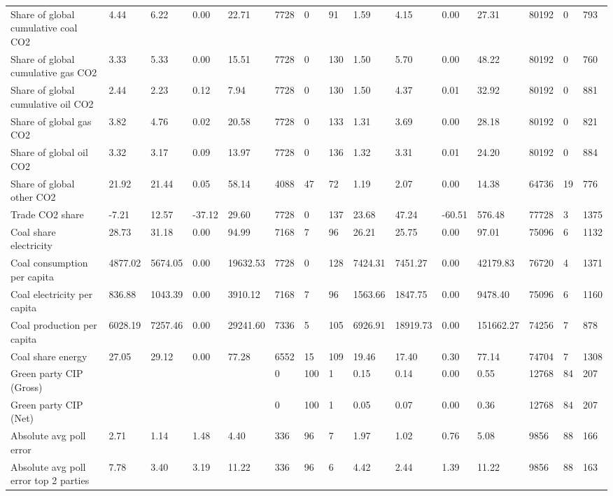 \begin{longtable}{lllllllllllllll}
Share of global cumulative coal CO2 & 4.44 & 6.22 & 0.00 & 22.71 & 7728 & 0 & 91 & 1.59 & 4.15 & 0.00 & 27.31 & 80192 & 0 & 793\\
Share of global cumulative gas CO2 & 3.33 & 5.33 & 0.00 & 15.51 & 7728 & 0 & 130 & 1.50 & 5.70 & 0.00 & 48.22 & 80192 & 0 & 760\\
\addlinespace
Share of global cumulative oil CO2 & 2.44 & 2.23 & 0.12 & 7.94 & 7728 & 0 & 130 & 1.50 & 4.37 & 0.01 & 32.92 & 80192 & 0 & 881\\
Share of global gas CO2 & 3.82 & 4.76 & 0.02 & 20.58 & 7728 & 0 & 133 & 1.31 & 3.69 & 0.00 & 28.18 & 80192 & 0 & 821\\
Share of global oil CO2 & 3.32 & 3.17 & 0.09 & 13.97 & 7728 & 0 & 136 & 1.32 & 3.31 & 0.01 & 24.20 & 80192 & 0 & 884\\
Share of global other CO2 & 21.92 & 21.44 & 0.05 & 58.14 & 4088 & 47 & 72 & 1.19 & 2.07 & 0.00 & 14.38 & 64736 & 19 & 776\\
Trade CO2 share & -7.21 & 12.57 & -37.12 & 29.60 & 7728 & 0 & 137 & 23.68 & 47.24 & -60.51 & 576.48 & 77728 & 3 & 1375\\
\addlinespace
Coal share electricity & 28.73 & 31.18 & 0.00 & 94.99 & 7168 & 7 & 96 & 26.21 & 25.75 & 0.00 & 97.01 & 75096 & 6 & 1132\\
Coal consumption per capita & 4877.02 & 5674.05 & 0.00 & 19632.53 & 7728 & 0 & 128 & 7424.31 & 7451.27 & 0.00 & 42179.83 & 76720 & 4 & 1371\\
Coal electricity per capita & 836.88 & 1043.39 & 0.00 & 3910.12 & 7168 & 7 & 96 & 1563.66 & 1847.75 & 0.00 & 9478.40 & 75096 & 6 & 1160\\
Coal production per capita & 6028.19 & 7257.46 & 0.00 & 29241.60 & 7336 & 5 & 105 & 6926.91 & 18919.73 & 0.00 & 151662.27 & 74256 & 7 & 878\\
Coal share energy & 27.05 & 29.12 & 0.00 & 77.28 & 6552 & 15 & 109 & 19.46 & 17.40 & 0.30 & 77.14 & 74704 & 7 & 1308\\
\addlinespace
Green party CIP (Gross) &  &  &  &  & 0 & 100 & 1 & 0.15 & 0.14 & 0.00 & 0.55 & 12768 & 84 & 207\\
Green party CIP (Net) &  &  &  &  & 0 & 100 & 1 & 0.05 & 0.07 & 0.00 & 0.36 & 12768 & 84 & 207\\
Absolute avg poll error & 2.71 & 1.14 & 1.48 & 4.40 & 336 & 96 & 7 & 1.97 & 1.02 & 0.76 & 5.08 & 9856 & 88 & 166\\
Absolute avg poll error top 2 parties & 7.78 & 3.40 & 3.19 & 11.22 & 336 & 96 & 6 & 4.42 & 2.44 & 1.39 & 11.22 & 9856 & 88 & 163\\

\end{longtable}
